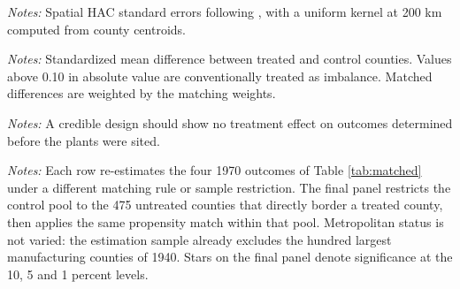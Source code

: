 \documentclass[12pt]{article}
\newcommand{\textcite}[1]{\citet{#1}}
\newcommand{\fittab}[1]{%
  \sbox{\tabbox}{#1}%
  \ifdim\wd\tabbox>\textwidth
    \resizebox{\textwidth}{!}{\usebox{\tabbox}}%
  \else\usebox{\tabbox}\fi}
\begin{document}
\begin{table}[p]
\centering
\caption{Conley spatial standard errors against state clustering}
\label{tab:conley}
\fittab{}
\vspace{2pt}
\begin{minipage}{\textwidth}\footnotesize \textit{Notes:} Spatial HAC standard errors following \textcite{conley1999}, with a uniform kernel at 200 km computed from county centroids.\end{minipage}
\end{table}

\begin{table}[p]
\centering
\caption{Excluding the twenty largest contract recipients}
\label{tab:droptop}
\fittab{}
\end{table}

\begin{table}[p]
\centering
\caption{Covariate balance before and after matching}
\label{tab:balance}
\fittab{}
\vspace{2pt}
\begin{minipage}{\textwidth}\footnotesize \textit{Notes:} Standardized mean difference between treated and control counties. Values above 0.10 in absolute value are conventionally treated as imbalance. Matched differences are weighted by the matching weights.\end{minipage}
\end{table}

\begin{table}[p]
\centering
\caption{Placebo: matched design applied to pre-treatment outcomes}
\label{tab:matchedplacebo}
\fittab{}
\vspace{2pt}
\begin{minipage}{\textwidth}\footnotesize \textit{Notes:} A credible design should show no treatment effect on outcomes determined before the plants were sited.\end{minipage}
\end{table}

\begin{table}[p]
\centering
\caption{Robustness of the matched design}
\label{tab:matchedrobust}
\fittab{}
\vspace{2pt}
\begin{minipage}{\textwidth}\footnotesize \textit{Notes:} Each row re-estimates the four 1970 outcomes of Table \ref{tab:matched} under a different matching rule or sample restriction. The final panel restricts the control pool to the 475 untreated counties that directly border a treated county, then applies the same propensity match within that pool. Metropolitan status is not varied: the estimation sample already excludes the hundred largest manufacturing counties of 1940. Stars on the final panel denote significance at the 10, 5 and 1 percent levels.\end{minipage}
\end{table}
\end{document}
